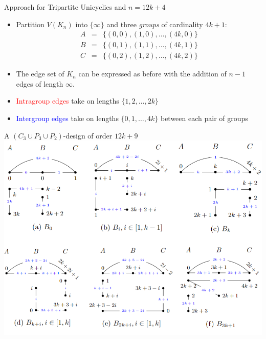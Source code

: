 \documentclass[11pt,serif,professionalfont,aspectratio=169]{beamer}
\theoremstyle{plain}
\begin{document}
\begin{frame}{Approach for Tripartite Unicyclics and $n=12k+4$}
  \begin{itemize}
      \item Partition $V(K_n)$ into $\{\infty\}$ and three \emph{groups} of cardinality $4k+1:$
      \[
\begin{array}{lll}
A&=&\{(0,0),(1,0),\dots,(4k,0)\}\\
B&=&\{(0,1),(1,1),\dots,(4k,1)\}\\
C&=&\{(0,2),(1,2),\dots,(4k,2)\}
\end{array}
\]
\item The edge set of $K_n$ can be expressed as before with the addition of $n-1$ edges of length $\infty.$
\item \textcolor{red}{Intragroup edges} take on lengths $\{1,2,\dots,2k\}$
\item \textcolor{blue}{Intergroup edges} take on lengths $\{0,1,\dots,4k\}$ between each pair of groups
  \end{itemize}
\end{frame}
\begin{frame}{A $(C_3 \cup P_3 \cup P_2)$-design of order $12k+9$}
    \centering
    \includegraphics[scale=0.6]{9mod12 ex.PNG}
\end{frame}

\end{document}
